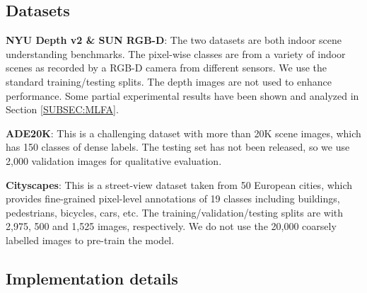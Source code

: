 \documentclass[10pt,twocolumn,twoside]{IEEEtran}
\begin{document}
\subsection{Datasets}

{\bf NYU Depth v2 \& SUN RGB-D}: The two datasets are both indoor scene understanding benchmarks. The pixel-wise classes are from a variety of indoor scenes as recorded by a RGB-D camera from different sensors. We use the standard training/testing splits. The depth images are not used to enhance performance. Some partial experimental results have been shown and analyzed in Section \ref{SUBSEC:MLFA}.

{\bf ADE20K}: This is a challenging dataset with more than 20K scene images, which has 150 classes of dense labels. The testing set has not been released, so we use 2,000 validation images for qualitative evaluation.

{\bf Cityscapes}: This is a street-view dataset taken from 50 European cities, which provides fine-grained pixel-level annotations of 19 classes including buildings, pedestrians, bicycles, cars, etc. The training/validation/testing splits are with 2,975, 500 and 1,525 images, respectively. We do not use the 20,000 coarsely labelled images to pre-train the model.

\subsection{Implementation details}
\end{document}
